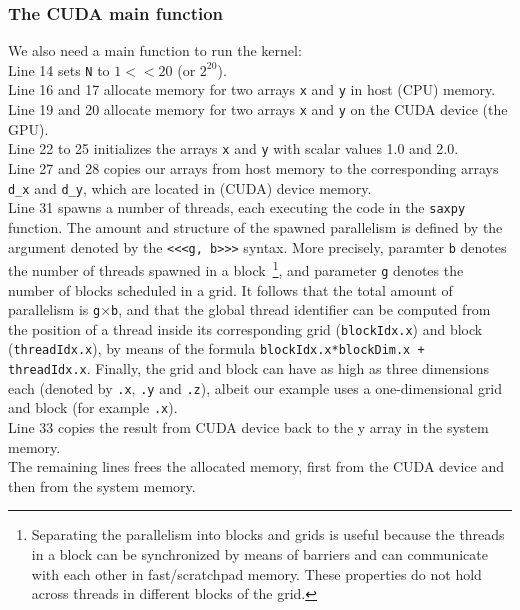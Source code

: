 \subsubsection{The CUDA main function}
We also need a main function to run the kernel:\\
Line 14 sets {\tt N} to $1 << 20$ (or $2^{20}$).\\
Line 16 and 17 allocate memory for two arrays {\tt x} and {\tt y} in host (CPU) memory.\\
Line 19 and 20 allocate memory for two arrays {\tt x} and {\tt y} on the CUDA device (the GPU).\\
Line 22 to 25 initializes the arrays {\tt x} and {\tt y} with scalar values 1.0 and 2.0.\\
Line 27 and 28 copies our arrays from host memory to the corresponding arrays 
{\tt d\_x} and {\tt d\_y}, which are located in (CUDA) device memory.\\
Line 31 spawns a number of threads, each executing the code in the 
\texttt{saxpy} function. The amount and structure of the spawned parallelism 
is defined by the argument denoted by the {\tt <<<g, b>>>} syntax. More precisely,
paramter {\tt b} denotes the number of threads spawned in a block~\footnote{
Separating the parallelism into blocks and grids is useful because the threads
in a block can be synchronized by means of barriers and can communicate with
each other in fast/scratchpad memory. These properties do not hold across threads
in different blocks of the grid. 
}, and parameter
{\tt g} denotes the number of blocks scheduled in a grid.
It follows that the total amount of parallelism
is {\tt g$\times$b}, and that the global thread identifier can be computed
from the position of a thread inside its corresponding grid ({\tt blockIdx.x}) 
and block ({\tt threadIdx.x}), by means of the formula 
{\tt blockIdx.x*blockDim.x + threadIdx.x}.
Finally, the grid and block can have as high as three dimensions each (denoted by 
{\tt .x}, {\tt .y} and {\tt .z}), albeit our example uses a one-dimensional
grid and block (for example {\tt .x}).
\\
Line 33 copies the result from CUDA device back to the y array in the system
memory. \\
The remaining lines frees the allocated memory, first from the CUDA device and
then from the system memory.



